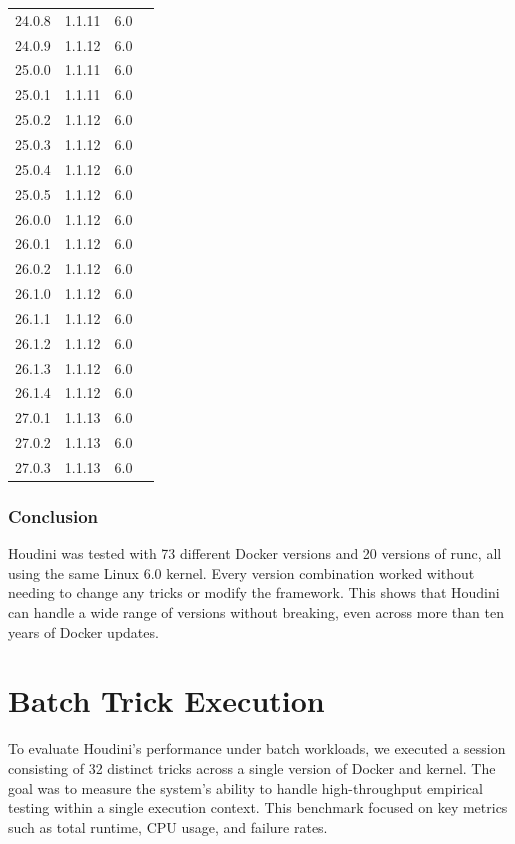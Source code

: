 \documentclass[12pt]{report}
\newcommand{\cmark}{\ding{51}} \newcommand{\xmark}{\ding{55}} \newcommand{\etal}{et~al.\ }
\begin{document}
\begin{doublespace}
{\begin{longtable}{|p{4cm}|p{3cm}||p{3cm}|p{2cm}|}
24.0.8 & 1.1.11 & 6.0 & \cmark \\
24.0.9 & 1.1.12 & 6.0 & \cmark \\
25.0.0 & 1.1.11 & 6.0 & \cmark \\
25.0.1 & 1.1.11 & 6.0 & \cmark \\
25.0.2 & 1.1.12 & 6.0 & \cmark \\
25.0.3 & 1.1.12 & 6.0 & \cmark \\
25.0.4 & 1.1.12 & 6.0 & \cmark \\
25.0.5 & 1.1.12 & 6.0 & \cmark \\
26.0.0 & 1.1.12 & 6.0 & \cmark \\
26.0.1 & 1.1.12 & 6.0 & \cmark \\
26.0.2 & 1.1.12 & 6.0 & \cmark \\
26.1.0 & 1.1.12 & 6.0 & \cmark \\
26.1.1 & 1.1.12 & 6.0 & \cmark \\
26.1.2 & 1.1.12 & 6.0 & \cmark \\
26.1.3 & 1.1.12 & 6.0 & \cmark \\
26.1.4 & 1.1.12 & 6.0 & \cmark \\
27.0.1 & 1.1.13 & 6.0 & \cmark \\
27.0.2 & 1.1.13 & 6.0 & \cmark \\
27.0.3 & 1.1.13 & 6.0 & \cmark \\
\end{longtable}
}

\subsubsection{Conclusion}

Houdini was tested with 73 different Docker versions and 20 versions of runc, all using the same Linux 6.0 kernel. Every version combination worked without needing to change any tricks or modify the framework. This shows that Houdini can handle a wide range of versions without breaking, even across more than ten years of Docker updates.



\section{Batch Trick Execution}

To evaluate Houdini’s performance under batch workloads, we executed a session consisting of 32 distinct tricks across a single version of Docker and kernel. The goal was to measure the system's ability to handle high-throughput empirical testing within a single execution context. This benchmark focused on key metrics such as total runtime, CPU usage, and failure rates.


\end{doublespace}
\end{document}
